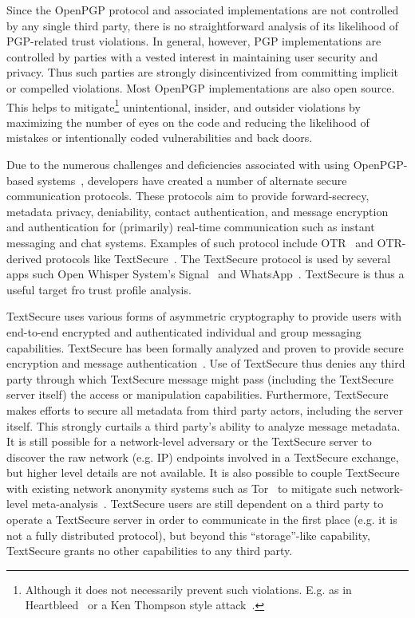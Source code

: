 Since the OpenPGP protocol and associated implementations are not
controlled by any single third party, there is no straightforward
analysis of its likelihood of PGP-related trust violations. In
general, however, PGP implementations are controlled by parties with a
vested interest in maintaining user security and privacy. Thus such
parties are strongly disincentivized from committing implicit or
compelled violations. Most OpenPGP implementations are also open
source. This helps to mitigate\footnote{Although it does not
  necessarily prevent such violations.  E.g. as in
  Heartbleed~\cite{heartbleed} or a Ken Thompson style
  attack~\cite{thompson1984}.} unintentional, insider, and outsider
violations by maximizing the number of eyes on the code and reducing
the likelihood of mistakes or intentionally coded vulnerabilities and
back doors.

Due to the numerous challenges and deficiencies associated with using
OpenPGP-based systems~\cite{green-pgp}, developers have created a
number of alternate secure communication protocols. These protocols
aim to provide forward-secrecy, metadata privacy, deniability, contact
authentication, and message encryption and authentication for
(primarily) real-time communication such as instant messaging and chat
systems. Examples of such protocol include OTR~\cite{otr-v3} and
OTR-derived protocols like TextSecure~\cite{otr-advanced-ratchet}. The
TextSecure protocol is used by several apps such Open Whisper System's
Signal~\cite{openwhisper} and WhatsApp~\cite{whatsapp}. TextSecure is
thus a useful target fro trust profile analysis.

TextSecure uses various forms of asymmetric cryptography to provide
users with end-to-end encrypted and authenticated individual and group
messaging capabilities. TextSecure has been formally analyzed and
proven to provide secure encryption and message
authentication~\cite{frosch2014}. Use of TextSecure thus denies any
third party through which TextSecure message might pass (including the
TextSecure server itself) the access or manipulation
capabilities. Furthermore, TextSecure makes efforts to secure all
metadata from third party actors, including the server itself. This
strongly curtails a third party's ability to analyze message
metadata. It is still possible for a network-level adversary or the
TextSecure server to discover the raw network (e.g. IP) endpoints
involved in a TextSecure exchange, but higher level details are not
available. It is also possible to couple TextSecure with existing
network anonymity systems such as Tor~\cite{dingledine2004} to
mitigate such network-level
meta-analysis~\cite{intercept-chatting}. TextSecure users are still
dependent on a third party to operate a TextSecure server in order to
communicate in the first place (e.g. it is not a fully distributed
protocol), but beyond this ``storage''-like capability, TextSecure
grants no other capabilities to any third party.

